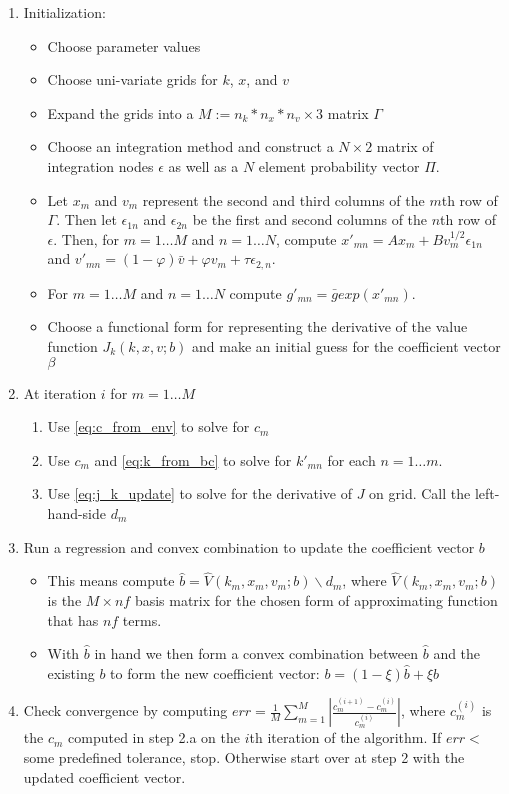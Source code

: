 \documentclass[10pt]{article}
\begin{document}
\begin{enumerate}
\item Initialization:
  \begin{itemize}
  \item Choose parameter values
  \item Choose uni-variate grids for $k$, $x$, and $v$
  \item Expand the grids into a $M:=n_k*n_x*n_v \times 3$ matrix $\Gamma$
  \item Choose an integration method and construct a $N \times 2$
    matrix of integration nodes $\epsilon$ as well as a $N$ element
    probability vector $\Pi$.
  \item Let $x_m$ and $v_m$ represent the second and third columns of the $m$th
    row of $\Gamma$. Then let $\epsilon_{1n}$ and $\epsilon_{2n}$ be the first
    and second columns of the $n$th row of $\epsilon$. Then, for $m=1 \dots M$
    and $n=1 \dots N$, compute $x'_{mn} = A x_m + B v_m^{1/2}
    \epsilon_{1n}$ and $v'_{mn} = (1 - \varphi) \bar{v} + \varphi v_m + \tau \epsilon_{2,n}$.
  \item For $m=1 \dots M$ and $n = 1 \dots N$ compute $g'_{mn} = \bar{g} exp(x'_{mn})$.
  \item Choose a functional form for representing the derivative of the value
    function $J_k(k, x, v; b)$ and make an initial guess for the coefficient
    vector $\beta$
  \end{itemize}
\item At iteration $i$ for $m = 1 \dots M$
  \begin{enumerate}
  \item Use \eqref{eq:c_from_env} to solve for $c_m$
  \item Use $c_m$ and \eqref{eq:k_from_bc} to solve for $k'_{mn}$ for each $n=1
    \dots m$.
  \item Use \eqref{eq:j_k_update} to solve for the derivative of $J$ on grid.
    Call the left-hand-side $d_m$
  \end{enumerate}
\item Run a regression and convex combination to update the coefficient vector $b$
  \begin{itemize}
  \item This means compute $\hat{b} = \hat{V}(k_m, x_m, v_m; b) \backslash d_m$, where
    $\hat{V}(k_m, x_m, v_m; b)$ is the $M \times nf$ basis matrix for the chosen
    form of approximating function that has $nf$ terms.
  \item With $\hat{b}$ in hand we then form a convex combination between
    $\hat{b}$ and the existing $b$ to form the new coefficient vector: $b =(1 -
    \xi) \hat{b} +  \xi b$
  \end{itemize}
\item Check convergence by computing $err = \frac{1}{M} \sum_{m=1}^M \left|
    \frac{c_m^{(i+1)} - c_m^{(i)}}{c_m^{(i)}}\right|$, where $c_m^{(i)}$ is the
  $c_m$ computed in step 2.a on the $i$th iteration of the algorithm. If $err <
  $ some predefined tolerance, stop. Otherwise start over at step 2 with the
  updated coefficient vector.
\end{enumerate}
\end{document}
